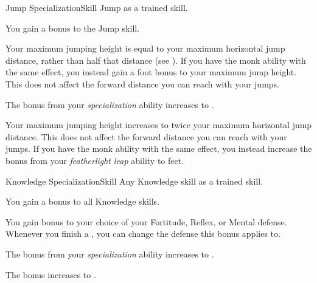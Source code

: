   \begin{feat}{Jump Specialization}{Skill}
    \featpre Jump as a trained skill.

     You gain a  bonus to the Jump skill.

     Your maximum jumping height is equal to your maximum horizontal jump distance, rather than half that distance (see ).
    If you have the  monk ability with the same effect, you instead gain a  foot bonus to your maximum jump height.
    This does not affect the forward distance you can reach with your jumps.

     The bonus from your \textit{specialization} ability increases to .

     Your maximum jumping height increases to twice your maximum horizontal jump distance.
    This does not affect the forward distance you can reach with your jumps.
    If you have the  monk ability with the same effect, you instead increase the bonus from your \textit{featherlight leap} ability to  feet.
  \end{feat}

  \begin{feat}{Knowledge Specialization}{Skill}
    \featpre Any Knowledge skill as a trained skill.

     You gain a  bonus to all Knowledge skills.

     You gain  bonus to your choice of your Fortitude, Reflex, or Mental defense.
    Whenever you finish a , you can change the defense this bonus applies to.

     The bonus from your \textit{specialization} ability increases to .

     The bonus increases to .
  \end{feat}

